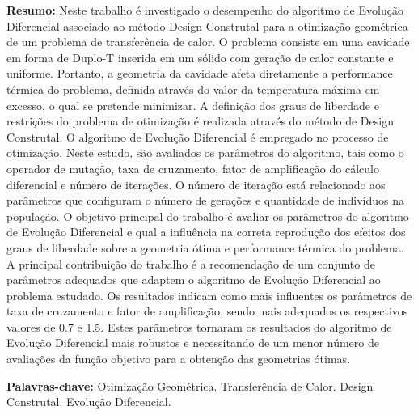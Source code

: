 \documentclass[12pt,A4,A4pt]{article}
\begin{document}
\begin{flushleft}
{\small {} \justify
\textbf{Resumo:} Neste trabalho é investigado o desempenho do algoritmo de Evolução Diferencial  associado ao método Design Construtal para a otimização geométrica de um problema de transferência de calor. O problema consiste em uma cavidade em forma de Duplo-T inserida em um sólido com geração de calor constante e uniforme. Portanto, a geometria da cavidade afeta diretamente a performance térmica do problema, definida através do valor da temperatura máxima em excesso, o qual se pretende minimizar. A definição dos graus de liberdade e restrições do problema de otimização é realizada através do método de Design Construtal. O algoritmo de Evolução Diferencial é empregado no processo de otimização. Neste estudo, são avaliados os parâmetros do algoritmo, tais como o operador de mutação, taxa de cruzamento, fator de amplificação do cálculo diferencial e número de iterações. O número de iteração está relacionado aos parâmetros que configuram o número de gerações e quantidade de indivíduos na população.  O objetivo principal do trabalho é avaliar os parâmetros do algoritmo de Evolução Diferencial e qual a influência na correta reprodução dos efeitos dos graus de liberdade sobre a geometria ótima e performance térmica do problema. A principal contribuição do trabalho é a recomendação de um conjunto de parâmetros adequados que adaptem o algoritmo de Evolução Diferencial ao problema estudado. Os resultados indicam como mais influentes os parâmetros de taxa de cruzamento e fator de amplificação, sendo mais adequados os  respectivos valores de 0.7 e 1.5. Estes parâmetros tornaram os resultados do algoritmo de Evolução Diferencial mais robustos e necessitando de um menor número de avaliações da função objetivo para a obtenção das geometrias ótimas.

\vspace{0.3cm}

\noindent\textbf{Palavras-chave:} Otimização Geométrica. Transferência de Calor. Design Construtal. Evolução Diferencial.}
\end{flushleft}


\end{document}
